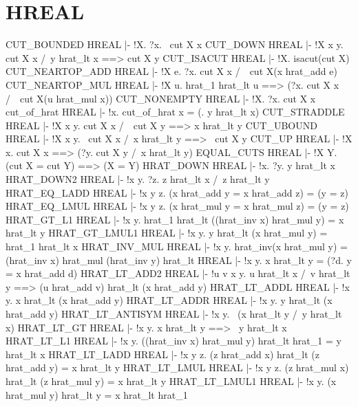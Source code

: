 \section{HREAL}
\THEOREM CUT\_BOUNDED HREAL
|- !X. ?x. ~cut X x
\ENDTHEOREM
\THEOREM CUT\_DOWN HREAL
|- !X x y. cut X x /\ y hrat_lt x ==> cut X y
\ENDTHEOREM
\THEOREM CUT\_ISACUT HREAL
|- !X. isacut(cut X)
\ENDTHEOREM
\THEOREM CUT\_NEARTOP\_ADD HREAL
|- !X e. ?x. cut X x /\ ~cut X(x hrat_add e)
\ENDTHEOREM
\THEOREM CUT\_NEARTOP\_MUL HREAL
|- !X u. hrat_1 hrat_lt u ==> (?x. cut X x /\ ~cut X(u hrat_mul x))
\ENDTHEOREM
\THEOREM CUT\_NONEMPTY HREAL
|- !X. ?x. cut X x
\ENDTHEOREM
\THEOREM cut\_of\_hrat HREAL
|- !x. cut_of_hrat x = (\y. y hrat_lt x)
\ENDTHEOREM
\THEOREM CUT\_STRADDLE HREAL
|- !X x y. cut X x /\ ~cut X y ==> x hrat_lt y
\ENDTHEOREM
\THEOREM CUT\_UBOUND HREAL
|- !X x y. ~cut X x /\ x hrat_lt y ==> ~cut X y
\ENDTHEOREM
\THEOREM CUT\_UP HREAL
|- !X x. cut X x ==> (?y. cut X y /\ x hrat_lt y)
\ENDTHEOREM
\THEOREM EQUAL\_CUTS HREAL
|- !X Y. (cut X = cut Y) ==> (X = Y)
\ENDTHEOREM
\THEOREM HRAT\_DOWN HREAL
|- !x. ?y. y hrat_lt x
\ENDTHEOREM
\THEOREM HRAT\_DOWN2 HREAL
|- !x y. ?z. z hrat_lt x /\ z hrat_lt y
\ENDTHEOREM
\THEOREM HRAT\_EQ\_LADD HREAL
|- !x y z. (x hrat_add y = x hrat_add z) = (y = z)
\ENDTHEOREM
\THEOREM HRAT\_EQ\_LMUL HREAL
|- !x y z. (x hrat_mul y = x hrat_mul z) = (y = z)
\ENDTHEOREM
\THEOREM HRAT\_GT\_L1 HREAL
|- !x y. hrat_1 hrat_lt ((hrat_inv x) hrat_mul y) = x hrat_lt y
\ENDTHEOREM
\THEOREM HRAT\_GT\_LMUL1 HREAL
|- !x y. y hrat_lt (x hrat_mul y) = hrat_1 hrat_lt x
\ENDTHEOREM
\THEOREM HRAT\_INV\_MUL HREAL
|- !x y. hrat_inv(x hrat_mul y) = (hrat_inv x) hrat_mul (hrat_inv y)
\ENDTHEOREM
\THEOREM hrat\_lt HREAL
|- !x y. x hrat_lt y = (?d. y = x hrat_add d)
\ENDTHEOREM
\THEOREM HRAT\_LT\_ADD2 HREAL
|- !u v x y.
    u hrat_lt x /\ v hrat_lt y ==> (u hrat_add v) hrat_lt (x hrat_add y)
\ENDTHEOREM
\THEOREM HRAT\_LT\_ADDL HREAL
|- !x y. x hrat_lt (x hrat_add y)
\ENDTHEOREM
\THEOREM HRAT\_LT\_ADDR HREAL
|- !x y. y hrat_lt (x hrat_add y)
\ENDTHEOREM
\THEOREM HRAT\_LT\_ANTISYM HREAL
|- !x y. ~(x hrat_lt y /\ y hrat_lt x)
\ENDTHEOREM
\THEOREM HRAT\_LT\_GT HREAL
|- !x y. x hrat_lt y ==> ~y hrat_lt x
\ENDTHEOREM
\THEOREM HRAT\_LT\_L1 HREAL
|- !x y. ((hrat_inv x) hrat_mul y) hrat_lt hrat_1 = y hrat_lt x
\ENDTHEOREM
\THEOREM HRAT\_LT\_LADD HREAL
|- !x y z. (z hrat_add x) hrat_lt (z hrat_add y) = x hrat_lt y
\ENDTHEOREM
\THEOREM HRAT\_LT\_LMUL HREAL
|- !x y z. (z hrat_mul x) hrat_lt (z hrat_mul y) = x hrat_lt y
\ENDTHEOREM
\THEOREM HRAT\_LT\_LMUL1 HREAL
|- !x y. (x hrat_mul y) hrat_lt y = x hrat_lt hrat_1
